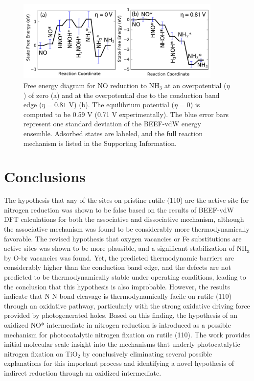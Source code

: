 \documentclass[journal=ascecg,manuscript=article,articletitle=true]{achemso}
\begin{document}
\begin{figure}
\includegraphics[width=0.9\textwidth]{figures/NO_reduction_FED.pdf}
\caption{Free energy diagram for NO reduction to NH$_3$ at an overpotential ($\eta$) of zero (a) and at the overpotential due to the conduction band edge ($\eta=0.81$ V) (b). The equilibrium potential ($\eta=0$) is computed to be 0.59 V (0.71 V experimentally). The blue error bars represent one standard deviation of the BEEF-vdW energy ensemble. Adsorbed states are labeled, and the full reaction mechanism is listed in the Supporting Information.}
\label{fig:FED_oxid_red}
\end{figure}


\section{Conclusions}


The hypothesis that any of the sites on pristine rutile (110) are the active site for nitrogen reduction was shown to be false based on the results of BEEF-vdW DFT calculations for both the associative and dissociative mechanism, although the associative mechanism was found to be considerably more thermodynamically favorable. The revised hypothesis that oxygen vacancies or Fe substitutions are active sites was shown to be more plausible, and a significant stabilization of NH$_{\mathrm{x}}$ by O-br vacancies was found. Yet, the predicted thermodynamic barriers are considerably higher  than the conduction band edge, and the defects are not predicted to be thermodynamically stable under operating conditions, leading to the conclusion that this hypothesis is also improbable. However, the results indicate that N-N bond cleavage is thermodynamically facile on rutile (110) through an oxidative pathway, particularly with the strong oxidative driving force provided by photogenerated holes. Based on this finding, the hypothesis of an oxidized NO* intermediate in nitrogen reduction is introduced as a possible mechanism for photocatalytic nitrogen fixation on rutile (110). The work provides initial molecular-scale insight into the mechanisms that underly photocatalytic nitrogen fixation on TiO$_2$ by conclusively eliminating several possible explanations for this important process and identifying a novel hypothesis of indirect reduction through an oxidized intermediate.
\end{document}
